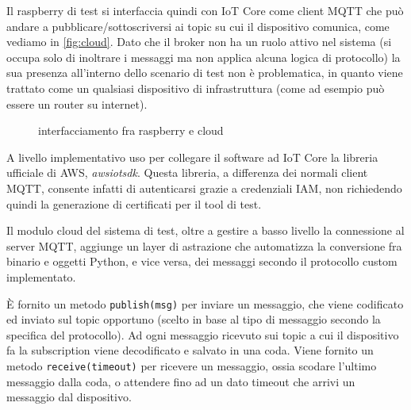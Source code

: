 \documentclass[12pt,a4paper,twoside,titlepage]{book}
\begin{document}
Il raspberry di test si interfaccia quindi con IoT Core come client MQTT che può
andare a pubblicare/sottoscriversi ai topic su cui il dispositivo comunica, come vediamo in \autoref{fig:cloud}.
Dato che il broker non ha un ruolo attivo nel sistema (si occupa solo di inoltrare i messaggi ma non
applica alcuna logica di protocollo) la sua presenza all'interno dello scenario di test non
è problematica, in quanto viene trattato come un qualsiasi dispositivo di infrastruttura
(come ad esempio può essere un router su internet).

\begin{figure}[h]
    \centering
    \caption{interfacciamento fra raspberry e cloud}
    \label{fig:cloud}
\end{figure}


A livello implementativo uso per collegare il software ad IoT Core
la libreria ufficiale di AWS, \textit{awsiotsdk}. Questa libreria, a differenza dei
normali client MQTT, consente infatti di autenticarsi grazie a credenziali IAM, non
richiedendo quindi la generazione di certificati per il tool di test.

Il modulo cloud del sistema di test, oltre a gestire a basso livello la connessione
al server MQTT, aggiunge un layer di astrazione che automatizza la conversione fra
binario e oggetti Python, e vice versa, dei messaggi secondo il protocollo custom
implementato.

È fornito un metodo \texttt{publish(msg)} per inviare un messaggio, che viene codificato ed
inviato sul topic opportuno (scelto in base al tipo di messaggio secondo la specifica
del protocollo). Ad ogni messaggio ricevuto sui topic a cui il dispositivo fa la
subscription viene decodificato e salvato in una coda. Viene fornito un metodo \texttt{receive(timeout)}
per ricevere un messaggio, ossia scodare l'ultimo messaggio dalla coda, o attendere
fino ad un dato timeout che arrivi un messaggio dal dispositivo.
\end{document}

